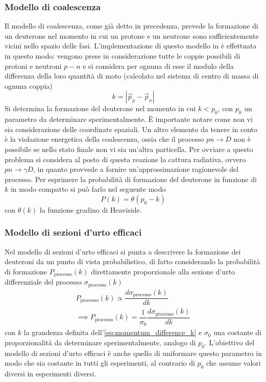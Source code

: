 \subsubsection{Modello di coalescenza}
Il modello di coalescenza, come già detto in precedenza, prevede la formazione di un deuterone nel momento in cui un protone e un neutrone sono sufficientemente vicini nello spazio delle fasi.
L'implementazione di questo modello in \pythiaa{} è effettuata in questo modo: vengono prese in considerazione tutte le coppie possibili di protoni e neutroni $p-n$ e si considera per ognuna di esse il modulo della differenza della loro quantità di moto (calcolato nel sistema di centro di massa di ognuna coppia)
\begin{equation}\label{eq:momentum_difference_k}
    k = |\vec p_p - \vec p_n|
\end{equation} 
Si determina la formazione del deuterone nel momento in cui $k<p_0$, con $p_0$ un parametro da determinare sperimentalmente.
È importante notare come non vi sia considerazione delle coordinate spaziali.
Un altro elemento da tenere in conto è la violazione energetica della coalescenza, ossia che il processo $pn\to D$ non è possibile se nello stato finale non vi sia un'altra particella.
Per ovviare a questo problema si considera al posto di questa reazione la cattura radiativa, ovvero $pn\to \gamma D$, in quanto provvede a fornire un'approssimazione ragionevole del processo.
Per esprimere la probabilità di formazione del deuterone in funzione di $k$ in modo compatto si può farlo nel seguente modo
\begin{equation}
    P(k) = \theta(p_0-k)
\end{equation}
con $\theta(k)$ la funzione gradino di Heaviside.

\subsubsection{Modello di sezioni d'urto efficaci}
Nel modello di sezioni d'urto efficaci si punta a descrivere la formazione dei deuteroni da un punto di vista probabilistico, di fatto considerando la probabilità di formazione $P_\text{processo}(k)$ direttamente proporzionale alla sezione d'urto differenziale del processo $\sigma_\text{processo}(k)$
\begin{gather}
    P_\text{processo}(k) \propto \dfrac{d\sigma_\text{processo}(k)}{dk} \\
    \implies P_\text{processo}(k) = \dfrac1{\sigma_0}\dfrac{d\sigma_\text{processo}(k)}{dk} 
\end{gather}
con $k$ la grandezza definita dell'\autoref{eq:momentum_difference_k} e $\sigma _0$ una costante di proporzionalità da determinare sperimentalmente, analogo di $p_0$.
L'obiettivo del modello di sezioni d'urto efficaci è anche quello di uniformare questo parametro in modo che sia costante in tutti gli esperimenti, al contrario di $p_0$ che assume valori diversi in esperimenti diversi. 

